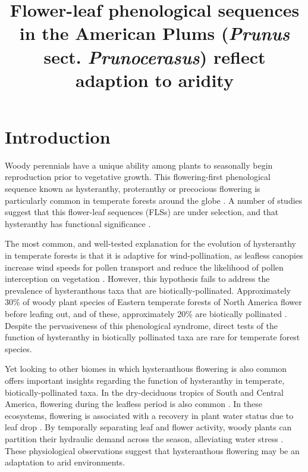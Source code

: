 \documentclass{article}[11pt]
\title{Flower-leaf phenological sequences in the American Plums (\textit{Prunus} sect. \textit{Prunocerasus}) reflect adaption to aridity}
\begin{document}

\maketitle


\section*{Introduction}
\noindent Woody perennials have a unique ability among plants to seasonally begin reproduction prior to vegetative growth. This flowering-first phenological sequence known as hysteranthy, proteranthy or precocious flowering is particularly common in temperate forests around the globe \citep{Rathcke_1985}. A number of studies suggest that this flower-leaf sequences (FLSs) are under selection, and that hysteranthy has functional significance \citep{Gougherty2018,Buonaiuto2020,Guo2014}.

\noindent The most common, and well-tested explanation for the evolution of hysteranthy in temperate forests is that it is adaptive for wind-pollination, as leafless canopies increase wind speeds for pollen transport and reduce the likelihood of pollen interception on vegetation \citep{Whitehead1969,Niklas1985}. However, this hypothesis fails to address the prevalence of hysteranthous taxa that are biotically-pollinated. Approximately 30\% of woody plant species of Eastern temperate forests of North America flower before leafing out, and of these, approximately 20\% are biotically pollinated  \citep{Buonaiuto2020}. Despite the pervasiveness of this phenological syndrome, direct tests of the function of hysteranthy in biotically pollinated taxa are rare for temperate forest species.

Yet looking to other biomes in which hysteranthous flowering is also common offers important insights regarding the function of hysteranthy in temperate, biotically-pollinated taxa. In the dry-deciduous tropics of South and Central America, flowering during the leafless period is also common \citep{Rathcke_1985,Franklin2016}. In these ecosystems, flowering is associated with a recovery in plant water status due to leaf drop \citep{Borchert1983,Reich1984}. By temporally separating leaf and flower activity, woody plants can partition their hydraulic demand across the season, alleviating water stress \citep{Gougherty2018,Franklin2016}. These physiological observations suggest that hysteranthous flowering may be an adaptation to arid environments.
\end{document}
